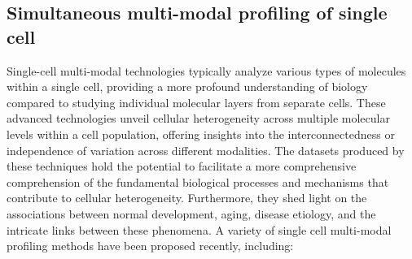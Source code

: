 \subsection{Simultaneous multi-modal profiling of single cell}
\label{background:sec1:mulitmodal}
Single-cell multi-modal technologies typically analyze various types of molecules within a single cell, providing a more profound understanding of biology compared to studying individual molecular layers from separate cells. These advanced technologies unveil cellular heterogeneity across multiple molecular levels within a cell population, offering insights into the interconnectedness or independence of variation across different modalities. The datasets produced by these techniques hold the potential to facilitate a more comprehensive comprehension of the fundamental biological processes and mechanisms that contribute to cellular heterogeneity. Furthermore, they shed light on the associations between normal development, aging, disease etiology, and the intricate links between these phenomena. A variety of single cell multi-modal profiling methods have been proposed recently, including:


